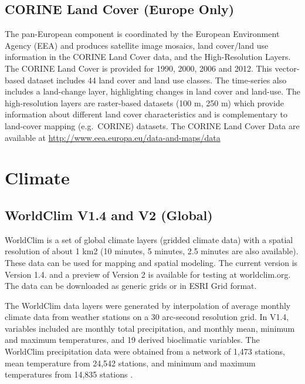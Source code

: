 \documentclass[10pt,b5paper,]{book}
\theoremstyle{definition}
\theoremstyle{definition}
\theoremstyle{definition}
\theoremstyle{remark}
\begin{document}
\hypertarget{corine-land-cover-europe-only}{%
\subsection{CORINE Land Cover (Europe
Only)}\label{corine-land-cover-europe-only}}

The pan-European component is coordinated by the European Environment
Agency (EEA) and produces satellite image mosaics, land cover/land use
information in the CORINE Land Cover data, and the High-Resolution
Layers. The CORINE Land Cover is provided for 1990, 2000, 2006 and 2012.
This vector-based dataset includes 44 land cover and land use classes.
The time-series also includes a land-change layer, highlighting changes
in land cover and land-use. The high-resolution layers are raster-based
datasets (100 m, 250 m) which provide information about different land
cover characteristics and is complementary to land-cover mapping
(e.g.~CORINE) datasets. The CORINE Land Cover Data are available at
\url{http://www.eea.europa.eu/data-and-maps/data}

\hypertarget{climate}{%
\section{Climate}\label{climate}}

\hypertarget{worldclim-v1.4-and-v2-global}{%
\subsection{WorldClim V1.4 and V2
(Global)}\label{worldclim-v1.4-and-v2-global}}

WorldClim is a set of global climate layers (gridded climate data) with
a spatial resolution of about 1 km2 (10 minutes, 5 minutes, 2.5 minutes
are also available). These data can be used for mapping and spatial
modeling. The current version is Version 1.4. and a preview of Version 2
is available for testing at worldclim.org. The data can be downloaded as
generic grids or in ESRI Grid format.

The WorldClim data layers were generated by interpolation of average
monthly climate data from weather stations on a 30 arc-second resolution
grid. In V1.4, variables included are monthly total precipitation, and
monthly mean, minimum and maximum temperatures, and 19 derived
bioclimatic variables. The WorldClim precipitation data were obtained
from a network of 1,473 stations, mean temperature from 24,542 stations,
and minimum and maximum temperatures from 14,835 stations
\citep{hijmans2005very}.
\end{document}
